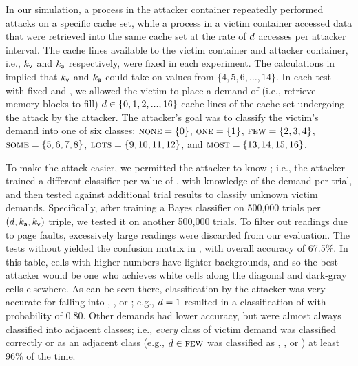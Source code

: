 In our simulation, a process in the attacker container repeatedly
performed \primeprobe attacks on a specific cache set, while a process
in a victim container accessed data that were retrieved into the same
cache set at the rate of $d$ accesses per attacker
\primeprobe interval.  The cache lines available to the victim
container and attacker container, i.e.,
$k_{\mathsf{v}}$ and
$k_{\mathsf{a}}$ respectively, were fixed in each
experiment.  The calculations in
 implied that
$k_{\mathsf{v}}$ and
$k_{\mathsf{a}}$ could take on values from
$\{4,5,6,\ldots,14\}$.  In each test with fixed
\linesPerContainer{\victimLabel} and
\linesPerContainer{\attackerLabel}, we allowed the victim to place a
demand of (i.e., retrieve memory blocks to fill) $d \in
\{0, 1, 2,...,16\}$ cache lines of the cache set undergoing the
\primeprobe attack by the attacker.  The attacker's goal was to
classify the victim's demand into one of six classes: $\textsc{none} =
\{0\}$, $\textsc{one} =\{1\}$, $\textsc{few}=\{2,3,4\}$,
$\textsc{some}=\{5,6,7,8\}$, $\textsc{lots}=\{9,10,11,12\}$, and
$\textsc{most}=\{13,14,15,16\}$.

To make the attack easier, we permitted the attacker to
know \linesPerContainer{\attackerLabel}; i.e., the attacker trained a
different classifier per value of \linesPerContainer{\attackerLabel},
with knowledge of the demand \victimDemand per \primeprobe trial, and
then tested against additional trial results to classify unknown
victim demands.  Specifically, after training a \naive{} Bayes
classifier on 500,000
\primeprobe trials per $(d,
k_{\mathsf{a}}, k_{\mathsf{v}})$
triple, we tested it on another 500,000 trials. To filter out \Probe
readings due to page faults, excessively large readings were discarded
from our evaluation. The tests without \cachebar yielded
the confusion matrix in , with overall
accuracy of 67.5\%.  In this table, cells with higher numbers have
lighter backgrounds, and so the best attacker would be one who
achieves white cells along the diagonal and dark-gray cells elsewhere.
As can be seen there, classification by the attacker was very accurate
for \victimDemand falling into \classNone, \classOne, or \classLots;
e.g., $d=1$ resulted in a classification of \classOne with
probability of $0.80$.  Other demands had lower accuracy, but
were almost always classified into adjacent classes; i.e.,
\textit{every} class of victim demand was classified correctly or as
an adjacent class (e.g., $d \in \textsc{few}$ was classified
as \classOne, \classFew, or \classSome) at least 96\% of the time.


